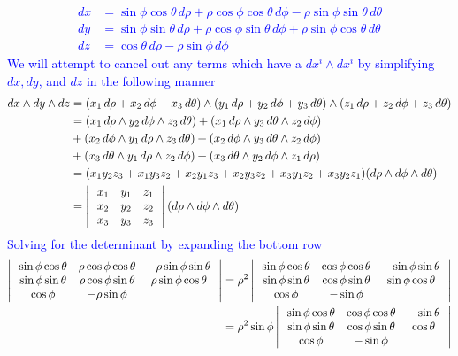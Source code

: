 \documentclass[10pt,a4paper]{report}
\newcommand{\BLUE}[1]{\textcolor{blue}{#1}}
\begin{document}
\begin{enumerate}[label=4.\arabic*]
\BLUE{\begin{align*}
	dx &= \sin\phi \cos \theta \,d\rho + \rho \cos \phi \cos \theta \,d\phi - \rho \sin\phi \sin \theta\,  d\theta \\
	dy &= \sin\phi\sin\theta\,d\rho + \rho\cos\phi\sin\theta\,d\phi + \rho\sin\phi\cos\theta\,d\theta \\
	dz &= \cos\theta\, d\rho-\rho\sin\phi\, d\phi
\end{align*}We will attempt to cancel out any terms which have a $dx^i\wedge dx^i$ by simplifying $dx, dy$, and $dz$ in the following manner
\begin{align*}
	dx \wedge dy \wedge dz &= (x_1\,d\rho + x_2\,d\phi+x_3\,d\theta)\wedge(y_1\,d\rho + y_2\,d\phi+y_3\,d\theta)\wedge(z_1\,d\rho + z_2\,d\phi+z_3\,d\theta) \\ 
	&= (x_1\,d\rho\wedge y_2\,d\phi\wedge z_3\,d\theta)+(x_1\,d\rho\wedge y_3\,d\theta\wedge z_2\,d\phi) \\
	&+ (x_2\,d\phi\wedge y_1\,d\rho \wedge z_3\,d\theta) + (x_2\,d\phi\wedge y_3\,d\theta\wedge z_2\,d\phi) \\
	&+ (x_3\,d\theta\wedge y_1\,d\rho \wedge z_2\,d\phi) + (x_3\,d\theta\wedge y_2\,d\phi\wedge z_1\,d\rho) \\
	&= (x_1y_2z_3+x_1y_3z_2 + x_2y_1z_3 + x_2y_3z_2 + x_3y_1z_2 + x_3y_2z_1)(d\rho\wedge d\phi\wedge d\theta) \\
	&= \left |\,  \begin{array}{c c c} x_1&y_1&z_1 \\ x_2 & y_2 & z_2 \\ x_3 & y_3 & z_3 \end{array}  \,\right |(d\rho\wedge d\phi\wedge d\theta)
\end{align*}Solving for the determinant by expanding the bottom row
\begin{align*}
	\DTHREEXTHREE{\sin\phi \cos \theta}{\rho \cos \phi \cos \theta }{- \rho \sin\phi \sin \theta}{\sin\phi\sin\theta}{ \rho\cos\phi\sin\theta} {\rho\sin\phi\cos\theta}{\cos\phi}{-\rho\sin\phi}{} &= \rho^2\DTHREEXTHREE{\sin\phi \cos \theta}{ \cos \phi \cos \theta }{-  \sin\phi \sin \theta}{\sin\phi\sin\theta}{\cos\phi\sin\theta} {\sin\phi\cos\theta}{\cos\phi}{-\sin\phi}{} \\
	&= \rho^2\sin\phi\DTHREEXTHREE{\sin\phi \cos \theta}{ \cos \phi \cos \theta }{- \sin \theta}{\sin\phi\sin\theta}{\cos\phi\sin\theta} {\cos\theta}{\cos\phi}{-\sin\phi}{}\\

\end{align*}}
\end{enumerate}
\end{document}

